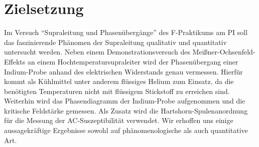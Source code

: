 \section{Zielsetzung}
Im Versuch ``Supraleitung und Phasenübergänge'' des F-Praktikums am PI soll das faszinierende Phänomen der Supraleitung qualitativ und quantitativ untersucht werden. Neben einem Demonstrationsversuch des Meißner-Ochsenfeld-Effekts an einem Hochtemperatursupraleiter wird der Phasenübergang einer Indium-Probe anhand des elektrischen Widerstands genau vermessen. Hierfür kommt als Kühlmittel unter anderem flüssiges Helium zum Einsatz, da die benötigten Temperaturen nicht mit flüssigem Stickstoff zu erreichen sind. Weiterhin wird das Phasendiagramm der Indium-Probe aufgenommen und die kritische Feldstärke gemessen. Als Zusatz wird die Hartshorn-Spulenanordnung für die Messung der AC-Suszeptibilität verwendet. Wir erhoffen uns einige aussagekräftige Ergebnisse sowohl auf phänomenologische als auch quantitative Art. 
